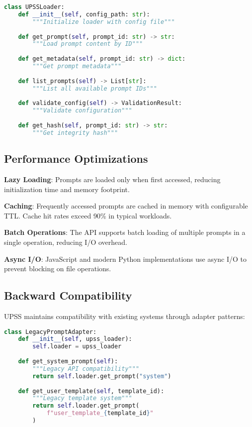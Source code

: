 \begin{lstlisting}[language=Python,caption=Core API Methods]
class UPSSLoader:
    def __init__(self, config_path: str):
        """Initialize loader with config file"""
        
    def get_prompt(self, prompt_id: str) -> str:
        """Load prompt content by ID"""
        
    def get_metadata(self, prompt_id: str) -> dict:
        """Get prompt metadata"""
        
    def list_prompts(self) -> List[str]:
        """List all available prompt IDs"""
        
    def validate_config(self) -> ValidationResult:
        """Validate configuration"""
        
    def get_hash(self, prompt_id: str) -> str:
        """Get integrity hash"""
\end{lstlisting}

\subsection{Performance Optimizations}

\textbf{Lazy Loading}: Prompts are loaded only when first accessed, reducing initialization time and memory footprint.

\textbf{Caching}: Frequently accessed prompts are cached in memory with configurable TTL. Cache hit rates exceed 90\% in typical workloads.

\textbf{Batch Operations}: The API supports batch loading of multiple prompts in a single operation, reducing I/O overhead.

\textbf{Async I/O}: JavaScript and modern Python implementations use async I/O to prevent blocking on file operations.

\subsection{Backward Compatibility}

UPSS maintains compatibility with existing systems through adapter patterns:

\begin{lstlisting}[language=Python,caption=Legacy Adapter]
class LegacyPromptAdapter:
    def __init__(self, upss_loader):
        self.loader = upss_loader
    
    def get_system_prompt(self):
        """Legacy API compatibility"""
        return self.loader.get_prompt("system")
    
    def get_user_template(self, template_id):
        """Legacy template system"""
        return self.loader.get_prompt(
            f"user_template_{template_id}"
        )
\end{lstlisting}


